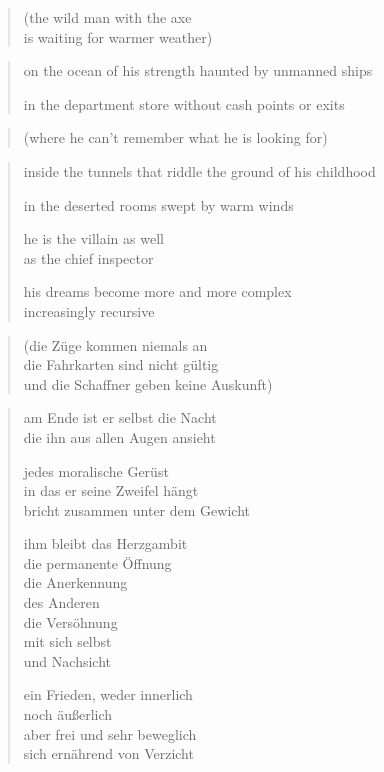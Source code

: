 {\begin{quote}
(the wild man with the axe\\
is waiting for warmer weather)
\end{quote}

\begin{verse}
on the ocean of his strength haunted by unmanned ships

in the department store without cash points or exits
\end{verse}

\begin{quote}
(where he can't remember what he is looking for)
\end{quote}

\begin{verse}
inside the tunnels that riddle the ground of his childhood

in the deserted rooms swept by warm winds

he is the villain as well\\
as the chief inspector

his dreams become more and more complex\\
increasingly recursive
\end{verse}


\clearpage

\begin{quote}
(die Züge kommen niemals an\\
die Fahrkarten sind nicht gültig\\
und die Schaffner geben keine Auskunft)
\end{quote}

\begin{verse}
am Ende ist er selbst die Nacht\\
die ihn aus allen Augen ansieht

jedes moralische Gerüst\\
in das er seine Zweifel hängt\\
bricht zusammen unter dem Gewicht

ihm bleibt das Herzgambit\\
die permanente Öffnung\\
die Anerkennung\\
des Anderen\\
die Versöhnung\\
mit sich selbst\\
und Nachsicht

ein Frieden, weder innerlich\\
noch äußerlich\\
aber frei und sehr beweglich\\
sich ernährend von Verzicht
\end{verse}

}

